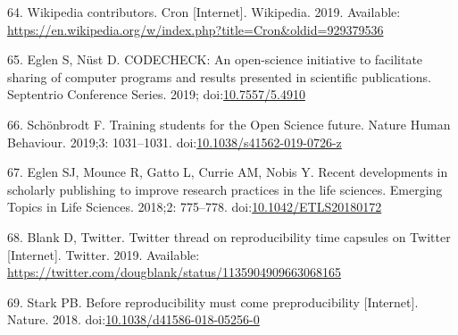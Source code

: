 \documentclass[10pt,letterpaper]{article}
\begin{document}
\leavevmode\hypertarget{ref-wikipedia_contributors_cron_2019}{}%
64. Wikipedia contributors. Cron {[}Internet{]}. Wikipedia. 2019.
Available:
\url{https://en.wikipedia.org/w/index.php?title=Cron\&oldid=929379536}

\leavevmode\hypertarget{ref-eglen_codecheck_2019}{}%
65. Eglen S, Nüst D. CODECHECK: An open-science initiative to facilitate
sharing of computer programs and results presented in scientific
publications. Septentrio Conference Series. 2019;
doi:\href{https://doi.org/10.7557/5.4910}{10.7557/5.4910}

\leavevmode\hypertarget{ref-schonbrodt_training_2019}{}%
66. Schönbrodt F. Training students for the Open Science future. Nature
Human Behaviour. 2019;3: 1031--1031.
doi:\href{https://doi.org/10.1038/s41562-019-0726-z}{10.1038/s41562-019-0726-z}

\leavevmode\hypertarget{ref-eglen_recent_2018}{}%
67. Eglen SJ, Mounce R, Gatto L, Currie AM, Nobis Y. Recent developments
in scholarly publishing to improve research practices in the life
sciences. Emerging Topics in Life Sciences. 2018;2: 775--778.
doi:\href{https://doi.org/10.1042/ETLS20180172}{10.1042/ETLS20180172}

\leavevmode\hypertarget{ref-blank_twitter_2019}{}%
68. Blank D, Twitter. Twitter thread on reproducibility time capsules on
Twitter {[}Internet{]}. Twitter. 2019. Available:
\url{https://twitter.com/dougblank/status/1135904909663068165}

\leavevmode\hypertarget{ref-stark_before_2018}{}%
69. Stark PB. Before reproducibility must come preproducibility
{[}Internet{]}. Nature. 2018.
doi:\href{https://doi.org/10.1038/d41586-018-05256-0}{10.1038/d41586-018-05256-0}

\nolinenumbers
\end{document}
